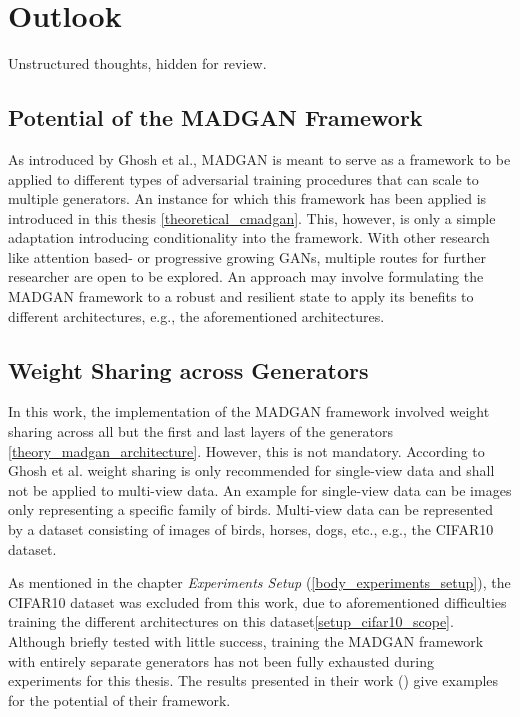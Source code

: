 \section{Outlook}\label{outlook}

Unstructured thoughts, hidden for review. 

\subsection{Potential of the MADGAN Framework}
As introduced by Ghosh et al., MADGAN is meant to serve as a framework to be applied to different types of adversarial training procedures that can scale to multiple generators. An instance for which this framework has been applied is introduced in this thesis \ref{theoretical_cmadgan}. This, however, is only a simple adaptation introducing conditionality into the framework. With other research like attention based- or progressive growing GANs, multiple routes for further researcher are open to be explored. An approach may involve formulating the MADGAN framework to a robust and resilient state to apply its benefits to different architectures, e.g., the aforementioned architectures. 



\subsection{Weight Sharing across Generators}
In this work, the implementation of the MADGAN framework involved weight sharing across all but the first and last layers of the generators \ref{theory_madgan_architecture}. However, this is not mandatory. According to Ghosh et al. weight sharing is only recommended for single-view data and shall not be applied to multi-view data. An example for single-view data can be images only representing a specific family of birds. Multi-view data can be represented by a dataset consisting of images of birds, horses, dogs, etc., e.g., the CIFAR10 dataset. 

As mentioned in the chapter \textit{Experiments Setup} (\ref{body_experiments_setup}), the CIFAR10 dataset was excluded from this work, due to aforementioned difficulties training the different architectures on this dataset\ref{setup_cifar10_scope}. Although briefly tested with little success, training the MADGAN framework with entirely separate generators has not been fully exhausted during experiments for this thesis. The results presented in their work (\cite{ghosh2018madgan}) give examples for the potential of their framework. 

